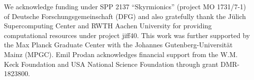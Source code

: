 \documentclass[
    10pt,
    aps,
    prl,
    twocolumn,
    floatfix,
    superscriptaddress
]{revtex4-2}
\begin{document}
\vfill \newpage


We  acknowledge  funding  under SPP 2137 ``Skyrmionics'' (project  MO  1731/7-1)  of  Deutsche  Forschungsgemeinschaft (DFG) and also gratefully thank the J\"ulich Supercomputing Center and RWTH Aachen University for providing computational resources under project jiff40. 
This work was further supported by the Max Planck Graduate Center with the Johannes Gutenberg-Universit\"at Mainz (MPGC).
Emil Prodan acknowledges financial support from the W.M. Keck Foundation and USA National Science Foundation through grant  DMR-1823800.





\end{document}

